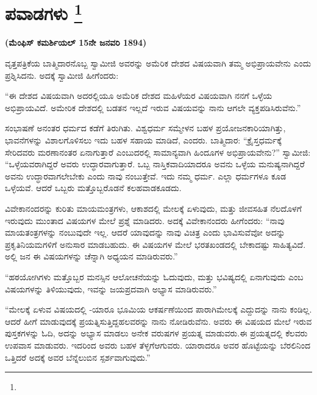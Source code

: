 
\chapter[ಪವಾಡಗಳು ]{ಪವಾಡಗಳು \protect\footnote{}}

\centerline{\textbf{(ಮೆಂಫಿಸ್​ ಕಮರ್ಶಿಯಲ್​ 15ನೇ ಜನವರಿ 1894)}}

\vskip 4pt

ವೃತ್ತಪತ್ರಿಕೆಯ ಬಾತ್ಮಿದಾರನೊಬ್ಬ ಸ್ವಾಮೀಜಿ ಅವರನ್ನು ಅಮೆರಿಕ ದೇಶದ ವಿಷಯವಾಗಿ ತಮ್ಮ ಅಭಿಪ್ರಾಯವೇನು ಎಂದು ಪ್ರಶ್ನಿಸಿದನು. ಅದಕ್ಕೆ ಸ್ವಾಮೀಜಿ ಹೀಗೆಂದರು:

\vskip 3pt

“ಈ ದೇಶದ ವಿಷಯವಾಗಿ ಅದರಲ್ಲಿಯೂ ಅಮೆರಿಕ ದೇಶದ ಮಹಿಳೆಯರ ವಿಷಯವಾಗಿ ನನಗೆ ಒಳ್ಳೆಯ ಅಭಿಪ್ರಾಯವಿದೆ. ಅಮೇರಿಕ ದೇಶದಲ್ಲಿ ಬಡತನ ಇಲ್ಲದೆ ಇರುವ ವಿಷಯವನ್ನು ನಾನು ಆಗಲೇ ವ್ಯಕ್ತಪಡಿಸಿರುವೆನು.”

\vskip 3pt

ಸಂಭಾಷಣೆ ಅನಂತರ ಧರ್ಮದ ಕಡೆಗೆ ತಿರುಗಿತು. ವಿಶ್ವಧರ್ಮ ಸಮ್ಮೇಳನ ಬಹಳ ಪ್ರಯೋಜನಕಾರಿಯಾಗಿತ್ತು, ಭಾವನೆಗಳನ್ನು ವಿಶಾಲಗೊಳಿಸಲು ಇದು ಬಹಳ ಸಹಾಯ ಮಾಡಿದೆ, ಎಂದರು. ಬಾತ್ಮಿದಾರ: “ಕ್ರೈಸ್ತಧರ್ಮಕ್ಕೆ ಸೇರಿದವರು ಮರಣಾನಂತರ ಏನಾಗುತ್ತಾರೆ ಎಂಬುದರಲ್ಲಿ ಸಾಮಾನ್ಯವಾಗಿ ಹಿಂದೂಗಳ ಅಭಿಪ್ರಾಯವೇನು?” ಸ್ವಾಮೀಜಿ: “ಒಳ್ಳೆಯವರಾಗಿದ್ದರೆ ಅವರು ಉದ್ಧಾರವಾಗುತ್ತಾರೆ. ಒಬ್ಬ ನಾಸ್ತಿಕವಾದಿಯಾದರೂ ಅವನು ಒಳ್ಳೆಯ ಮನುಷ್ಯನಾಗಿದ್ದರೆ ಅವನು ಉದ್ಧಾರವಾಗಲೇಬೇಕು ಎಂದು ನಾವು ನಂಬುತ್ತೇವೆ. ಇದು ನಮ್ಮ ಧರ್ಮ. ಎಲ್ಲಾ ಧರ್ಮಗಳೂ ಕೂಡ ಒಳ್ಳೆಯವೆ. ಆದರೆ ಒಬ್ಬರು ಮತ್ತೊಬ್ಬರೊಡನೆ ಕಲಹವಾಡಕೂಡದು.

\vskip 3pt

ವಿವೇಕಾನಂದರನ್ನು ಕುರಿತು ಮಾಯಮಂತ್ರಗಳು, ಆಕಾಶದಲ್ಲಿ ಮೇಲಕ್ಕೆ ಏಳುವುದು, ಮತ್ತು ಜೀವಸಹಿತ ನೆಲದೊಳಗೆ ಇರುವುದು ಮುಂತಾದ ವಿಷಯಗಳ ಮೇಲೆ ಪ್ರಶ್ನೆ ಮಾಡಿದರು. ಅದಕ್ಕೆ ವಿವೇಕಾನಂದರು ಹೀಗೆಂದರು: “ನಾವು ಮಾಯತಂತ್ರಗಳನ್ನು ನಂಬುವುದೇ ಇಲ್ಲ. ಆದರೆ ಯಾವುದನ್ನು ನಾವು ವಿಚಿತ್ರ ಎಂದು ಭಾವಿಸುವೆವೋ ಅದನ್ನು ಪ್ರಕೃತಿನಿಯಮಗಳಿಗೆ ಅನುಸಾರ ಮಾಡಬಹುದು. ಈ ವಿಷಯಗಳ ಮೇಲೆ ಭರತಖಂಡದಲ್ಲಿ ಬೇಕಾದಷ್ಟು ಸಾಹಿತ್ಯವಿದೆ. ಅಲ್ಲಿ ಜನ ಈ ವಿಷಯಗಳನ್ನು ಚೆನ್ನಾಗಿ ಅಧ್ಯಯನ ಮಾಡಿರುವರು.”

\vskip 5pt

“ಹಠಯೋಗಿಗಳು ಮತ್ತೊಬ್ಬರ ಮನಸ್ಸಿನ ಆಲೋಚನೆಯನ್ನು ಓದುವುದು, ಮತ್ತು ಭವಿಷ್ಯದಲ್ಲಿ ಏನಾಗುವುದು ಎಂಬ ವಿಷಯಗಳನ್ನು ತಿಳಿಯುವುದು, ಇವನ್ನು ಜಯಪ್ರದವಾಗಿ ಅಭ್ಯಾಸ ಮಾಡಿರುವರು.”

\vskip 5pt

“ಮೇಲಕ್ಕೆ ಏಳುವ ವಿಷಯದಲ್ಲಿ -ಯಾರೂ ಭೂಮಿಯ ಆಕರ್ಷಣೆಯಿಂದ ಪಾರಾಗಿ\break ಮೇಲಕ್ಕೆ ಎದ್ದುದನ್ನು ನಾನು ಕಂಡಿಲ್ಲ. ಆದರೆ ಹೀಗೆ ಮಾಡುವುದಕ್ಕೆ ಪ್ರಯತ್ನಿಸುತ್ತಿದ್ದ\break ಹಲವರನ್ನು ನಾನು ನೋಡಿರುವೆನು. ಅವರು ಈ ವಿಷಯದ ಮೇಲೆ ಇರುವ ಪುಸ್ತಕಗಳನ್ನು ಓದಿ, ಅದನ್ನು ಅಭ್ಯಾಸ ಮಾಡಲು ಅನೇಕ ವರುಷಗಳ ಪ್ರಯತ್ನ ಮಾಡುವರು.\break ಈ ಪ್ರಯತ್ನದಲ್ಲಿ ಕೆಲವರು ಉಪವಾಸ ಮಾಡುವರು. ಇದರಿಂದ ಅವರು ಬಹಳ ತೆಳ್ಳಗೆ\break ಆಗುವರು. ಯಾರಾದರೂ ಅವರ ಹೊಟ್ಟೆಯನ್ನು ಬೆರಲಿನಿಂದ ಒತ್ತಿದರೆ ಅದಕ್ಕೆ ಅವರ ಬೆನ್ನೆಲುಬಿನ ಸ್ಪರ್ಶವಾಗುವುದು.”

